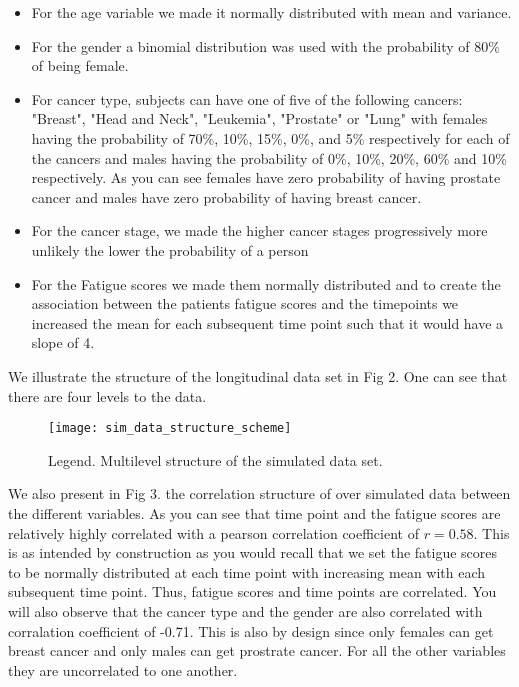 \documentclass[fleqn,10pt]{wlscirep}\usepackage[]{graphicx}\usepackage[]{color}
\begin{document}
\begin{itemize}

\item For the age variable we made it normally distributed with mean and variance. 
\item For the gender a binomial distribution was used with the probability of 80\% of being female. 
\item For cancer type, subjects can have one of five of the following cancers: "Breast", "Head and Neck", "Leukemia", "Prostate" or "Lung"  with females having the probability of 70\%, 10\%, 15\%, 0\%, and 5\% respectively for each of the cancers and males having the probability of 0\%, 10\%, 20\%, 60\% and 10\% respectively. As you can see females have zero probability of having prostate cancer and males have zero probability of having breast cancer. 
\item For the cancer stage, we made the higher cancer stages progressively more unlikely the lower the probability of a person 
\item For the Fatigue scores we made them normally distributed and to create the association between the patients fatigue scores and the timepoints we increased the mean for each subsequent time point such that it would have a slope of 4. 

\end{itemize}

We illustrate the structure of the longitudinal data set in Fig 2. One can see that there are four levels to the data. 

\begin{figure}[H]
\centering
\texttt{[image: sim\_data\_structure\_scheme]}
\caption{Legend. Multilevel structure of the simulated data set.}
\label{fig:sim_data_structure_scheme}
\end{figure}

We also present in Fig 3. the correlation structure of over simulated data between the different variables. As you can see that time point and the fatigue scores are relatively highly correlated with a pearson correlation coefficient of $r=0.58$. This is as intended by construction as you would recall that we set the fatigue scores to be normally distributed at each time point with increasing mean with each subsequent time point. Thus, fatigue scores and time points are correlated. You will also observe that the cancer type and the gender are also correlated with corralation coefficient of -0.71. This is also by design since only females can get breast cancer and only males can get prostrate cancer. For all the other variables they are uncorrelated to one another. 
\end{document}
